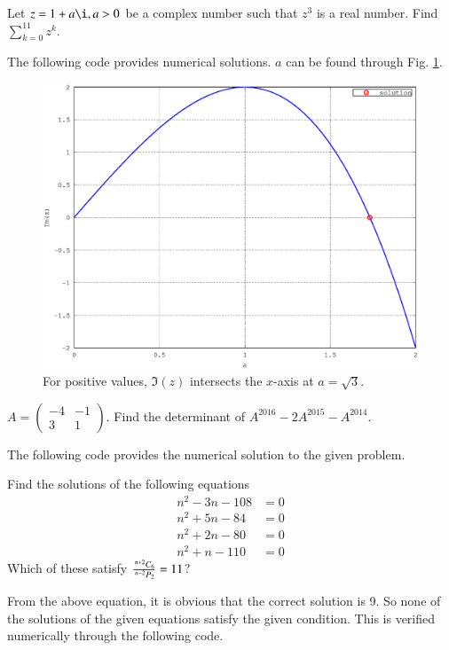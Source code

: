 \documentclass[journal,12pt,twocolumn]{IEEEtran}
\begin{document}
\begin{problem}
Let $z = 1 + a \i, a > 0$  be a complex number such that $z^3$ is a real number. Find $\sum_{k = 0}^{11}z^k$.
\end{problem}
\solution

The following code provides numerical solutions.  $a$ can be found through Fig. \ref{fig_16}.

\begin{figure}[h]
\centering
\includegraphics[width=\columnwidth]{./version_2/ee16b1016/ee16b1016}
\caption{ For positive values, $\Im(z)$ intersects the $x$-axis at $a = \sqrt{3}$.}
\label{fig_16}	
\end{figure}
%
\begin{problem}
$A = 
\begin{pmatrix}
-4 & -1 \\
3 & 1
\end{pmatrix}
$.
Find the determinant of $A^{2016}-2A^{2015}-A^{2014}$.
\end{problem}
%
\solution

The following code provides the numerical solution to the given problem.

%
\begin{problem}
Find the solutions of the following equations
\begin{align*}
n^2-3n-108 &= 0 \\
n^2 + 5n -84 &= 0 \\
n^2 + 2n - 80 &=0 \\
n^2+n-110 &= 0
\end{align*}
Which of these satisfy $\frac{\,^{n+2}C_{6}}{\,^{n-2}P_{2}} = 11$?
\end{problem}		
%
%
\solution

From the above equation, it is obvious that the correct solution is 9.  So none of the solutions
of the given equations satisfy the given condition.  This is verified numerically through the following code.

%
\end{document}
